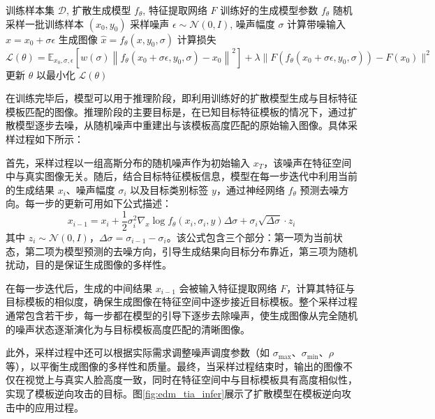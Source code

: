 \begin{algorithm}[H]
  \caption{模板逆向攻击模型训练}
  \label{alg:edm_tia_train}
  \begin{algorithmic}[1]
    \REQUIRE 训练样本集 $\mathcal{D}$, 扩散生成模型 $f_\theta$, 特征提取网络 $F$
    \ENSURE 训练好的生成模型参数 $f_\theta$
    \STATE 随机采样一批训练样本 $(x_0, y_0)$
    \STATE 采样噪声 $\epsilon \sim \mathcal{N}(0, I)$, 噪声幅度 $\sigma$
    \STATE 计算带噪输入 $x = x_0 + \sigma \epsilon$
    \STATE 生成图像 $\hat{x} = f_\theta(x, y_0, \sigma)$
    \STATE 计算损失
    \[
      \mathcal{L}(\theta) = \mathbb{E}_{x_0, \sigma, \epsilon} \left[ w(\sigma) \left\|  f_\theta(x_0 + \sigma \epsilon,y_0,\sigma) - x_0 \right\|^2 \right]
      + \lambda \| F( f_\theta(x_0 + \sigma \epsilon,y_0,\sigma)) - F(x_0) \|^2
    \]
    \ENDFOR
    \STATE 更新 $\theta$ 以最小化 $\mathcal{L}(\theta)$
    \ENDFOR
  \end{algorithmic}
\end{algorithm}


在训练完毕后，模型可以用于推理阶段，即利用训练好的扩散模型生成与目标特征模板匹配的图像。推理阶段的主要目标是，在已知目标特征模板的情况下，通过扩散模型逐步去噪，从随机噪声中重建出与该模板高度匹配的原始输入图像。具体采样过程如下所示：

首先，采样过程以一组高斯分布的随机噪声作为初始输入 $x_T$，该噪声在特征空间中与真实图像无关。随后，结合目标特征模板信息，模型在每一步迭代中利用当前的生成结果 $x_i$、噪声幅度 $\sigma_i$ 以及目标类别标签 $y$，通过神经网络 $f_\theta$ 预测去噪方向。每一步的更新可用如下公式描述：
\begin{equation}
  x_{i-1} = x_i + \frac{1}{2} \sigma_i^2 \nabla_x \log f_\theta(x_i, \sigma_i, y) \Delta \sigma + \sigma_i \sqrt{\Delta \sigma} \cdot z_i
\end{equation}
其中 $z_i \sim \mathcal{N}(0, I)$，$\Delta \sigma = \sigma_{i-1} - \sigma_i$。该公式包含三个部分：第一项为当前状态，第二项为模型预测的去噪方向，引导生成结果向目标分布靠近，第三项为随机扰动，目的是保证生成图像的多样性。

在每一步迭代后，生成的中间结果 $x_{i-1}$ 会被输入特征提取网络 $F$，计算其特征与目标模板的相似度，确保生成图像在特征空间中逐步接近目标模板。整个采样过程通常包含若干步，每一步都在模型的引导下逐步去除噪声，使生成图像从完全随机的噪声状态逐渐演化为与目标模板高度匹配的清晰图像。

此外，采样过程中还可以根据实际需求调整噪声调度参数（如 $\sigma_{\text{max}}$、$\sigma_{\text{min}}$、$\rho$ 等），以平衡生成图像的多样性和质量。最终，当采样过程结束时，输出的图像不仅在视觉上与真实人脸高度一致，同时在特征空间中与目标模板具有高度相似性，实现了模板逆向攻击的目标。图\ref{fig:edm_tia_infer}展示了扩散模型在模板逆向攻击中的应用过程。


